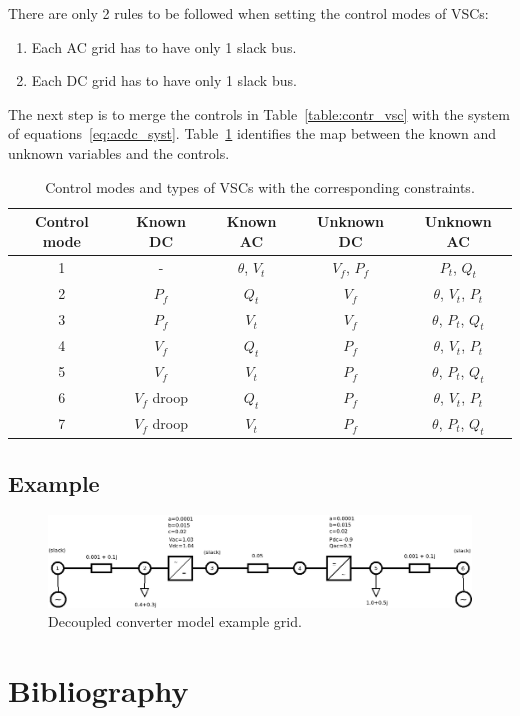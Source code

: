 \documentclass[11pt]{article}
\begin{document}
	There are only 2 rules to be followed when setting the control modes of VSCs:
	\begin{enumerate}
		\item Each AC grid has to have only 1 slack bus.
		\item Each DC grid has to have only 1 slack bus.
	\end{enumerate}
	The next step is to merge the controls in Table~\ref{table:contr_vsc} with the system of equations~\eqref{eq:acdc_syst}. Table~\ref{table:vsc_map} identifies the map between the known and unknown variables and the controls.

	\begin{table}[!htb]\centering
		\caption{Control modes and types of VSCs with the corresponding constraints.}
		\begin{tabular}{ccccc}
			\hline
			\textbf{Control mode} & \textbf{Known DC} & \textbf{Known AC} & \textbf{Unknown DC} & \textbf{Unknown AC} \\
			\hline
			\hline
			1 & - & $\theta$, $V_t$ & $V_f$, $P_f$ & $P_t$, $Q_t$ \\
			2 & $P_f$ & $Q_t$ & $V_f$ & $\theta$, $V_t$, $P_t$ \\
			3 & $P_f$ & $V_t$ & $V_f$ & $\theta$, $P_t$, $Q_t$ \\
			4 & $V_f$ & $Q_t$ & $P_f$ & $\theta$, $V_t$, $P_t$ \\
			5 & $V_f$ & $V_t$ & $P_f$ & $\theta$, $P_t$, $Q_t$ \\
			6 & $V_f$ droop & $Q_t$ & $P_f$ & $\theta$, $V_t$, $P_t$ \\
			7 & $V_f$ droop & $V_t$ & $P_f$ & $\theta$, $P_t$, $Q_t$ \\
			\hline
		\end{tabular}
		\label{table:vsc_map}
	\end{table}

	\subsection{Example}
	
	
	
	\begin{figure}[h!]
		\centering
		\includegraphics[width=1.0\linewidth]{acdc_6bus_diagram}
		\caption{Decoupled converter model example grid.}
		\label{fig:acdc6busdiagram}
	\end{figure}

	
	\section{Bibliography}
	\printbibliography
	
\end{document}
